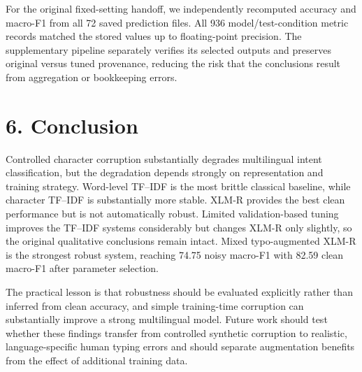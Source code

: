 \documentclass[11pt,a4paper]{article}
\begin{document}
For the original fixed-setting handoff, we independently recomputed accuracy and macro-F1 from all 72 saved prediction files. All 936 model/test-condition metric records matched the stored values up to floating-point precision. The supplementary pipeline separately verifies its selected outputs and preserves original versus tuned provenance, reducing the risk that the conclusions result from aggregation or bookkeeping errors.

\section*{6. Conclusion}
Controlled character corruption substantially degrades multilingual intent classification, but the degradation depends strongly on representation and training strategy. Word-level TF--IDF is the most brittle classical baseline, while character TF--IDF is substantially more stable. XLM-R provides the best clean performance but is not automatically robust. Limited validation-based tuning improves the TF--IDF systems considerably but changes XLM-R only slightly, so the original qualitative conclusions remain intact. Mixed typo-augmented XLM-R is the strongest robust system, reaching 74.75 noisy macro-F1 with 82.59 clean macro-F1 after parameter selection.

The practical lesson is that robustness should be evaluated explicitly rather than inferred from clean accuracy, and simple training-time corruption can substantially improve a strong multilingual model. Future work should test whether these findings transfer from controlled synthetic corruption to realistic, language-specific human typing errors and should separate augmentation benefits from the effect of additional training data.



\end{document}
